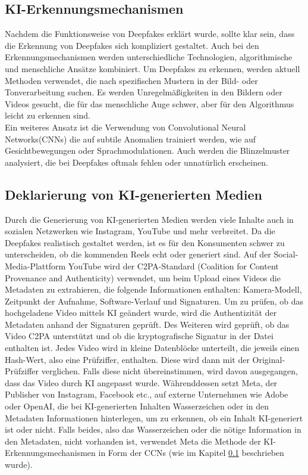 \documentclass[a4paper,12pt]{article}
\begin{document}
\subsection{KI-Erkennungsmechanismen}\label{subsec:KI-Erkennungsmechanismen}
Nachdem die Funktionsweise von Deepfakes erklärt wurde, sollte klar sein,
dass die Erkennung von Deepfakes sich kompliziert gestaltet.
Auch bei den Erkennungsmechanismen werden unterschiedliche Technologien, algorithmische und menschliche Ansätze kombiniert.
Um Deepfakes zu erkennen, werden aktuell Methoden verwendet, die nach spezifischen Mustern in der Bild- oder Tonverarbeitung suchen.
Es werden Unregelmäßigkeiten in den Bildern oder Videos gesucht, die für das menschliche Auge schwer,
aber für den Algorithmus leicht zu erkennen sind.\\
Ein weiteres Ansatz ist die Verwendung von Convolutional Neural Networks(CNNs)
die auf subtile Anomalien trainiert werden, wie auf Gesichtbewegungen oder Sprachmodulationen.
Auch werden die Blinzelmuster analysiert, die bei Deepfakes oftmals fehlen oder unnatürlich erscheinen.\cite{BVDW2024}

\subsection{Deklarierung von KI-generierten Medien}
Durch die Generierung von KI-generierten Medien werden viele Inhalte auch in sozialen Netzwerken wie Instagram, 
YouTube und mehr verbreitet. 
Da die Deepfakes realistisch gestaltet werden, 
ist es für den Konsumenten schwer zu unterscheiden, 
ob die kommenden Reels echt oder generiert sind.
Auf der Social-Media-Plattform YouTube wird der C2PA-Standard (Coalition for Content Provenance and Authenticity) verwendet, 
um beim Upload eines Videos die Metadaten zu extrahieren, 
die folgende Informationen enthalten: Kamera-Modell, 
Zeitpunkt der Aufnahme, Software-Verlauf und Signaturen. 
Um zu prüfen, ob das hochgeladene Video mittels KI geändert wurde, 
wird die Authentizität der Metadaten anhand der Signaturen geprüft. 
Des Weiteren wird geprüft, ob das Video C2PA unterstützt und ob die kryptografische Signatur in der Datei enthalten ist.
Jedes Video wird in kleine Datenblöcke unterteilt, 
die jeweils einen Hash-Wert, also eine Prüfziffer, 
enthalten. Diese wird dann mit der Original-Prüfziffer verglichen. 
Falls diese nicht übereinstimmen, wird davon ausgegangen, 
dass das Video durch KI angepasst wurde.\cite{TheVerge2024a}
Währenddessen setzt Meta, der Publisher von Instagram, Facebook etc., auf externe Unternehmen wie Adobe oder OpenAI,
die bei KI-generierten Inhalten Wasserzeichen oder in den Metadaten Informationen hinterlegen,
um zu erkennen, ob ein Inhalt KI-generiert ist oder nicht. Falls beides,
also das Wasserzeichen oder die nötige Information in den Metadaten,
nicht vorhanden ist, verwendet Meta die Methode der KI-Erkennungsmechanismen in Form der CCNs (wie im Kapitel \ref{subsec:KI-Erkennungsmechanismen} beschrieben wurde).\cite{TheVerge2024b}\cite{Meta2024}
\end{document}
